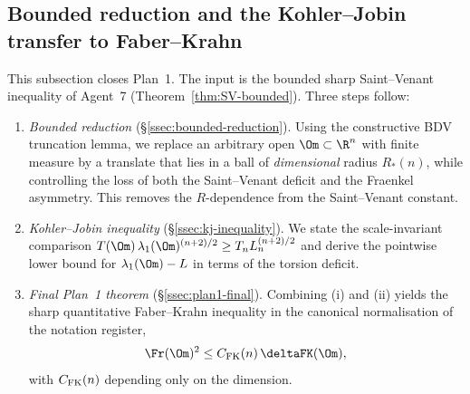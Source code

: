 %
%
%
%

\subsection{Bounded reduction and the Kohler--Jobin transfer to Faber--Krahn}
\label{sec:plan1-kj-transfer}

This subsection closes Plan~1. The input is the bounded sharp
Saint--Venant inequality of Agent~7 (Theorem~\ref{thm:SV-bounded}).
Three steps follow:
\begin{enumerate}
\item[(i)] \emph{Bounded reduction}
(\S\ref{ssec:bounded-reduction}). Using the constructive BDV
truncation lemma, we replace an arbitrary open
$\Om\subset\R^n$ with finite measure by a translate that lies in a
ball of \emph{dimensional} radius $R_*(n)$, while controlling the loss
of both the Saint--Venant deficit and the Fraenkel asymmetry. This
removes the $R$-dependence from the Saint--Venant constant.
\item[(ii)] \emph{Kohler--Jobin inequality}
(\S\ref{ssec:kj-inequality}). We state the scale-invariant comparison
$T(\Om)\,\lambda_1(\Om)^{(n+2)/2}\ge T_n L_n^{(n+2)/2}$ and derive the
pointwise lower bound for $\lambda_1(\Om)-L$ in terms of the torsion
deficit.
\item[(iii)] \emph{Final Plan~1 theorem}
(\S\ref{ssec:plan1-final}). Combining (i) and (ii) yields the sharp
quantitative Faber--Krahn inequality in the canonical normalisation of
the notation register,
\[
\Fr(\Om)^2 \le C_{\rm FK}(n)\,\deltaFK(\Om),
\]
with $C_{\rm FK}(n)$ depending only on the dimension.
\end{enumerate}

